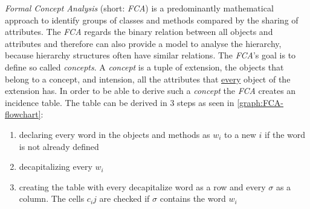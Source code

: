 \emph{Formal Concept Analysis} (short: \emph{FCA}) is a predominantly mathematical approach to identify groups of classes and methods compared by the sharing of attributes. The \emph{FCA} regards the binary relation between all objects and attributes and therefore can also provide a model to analyse the hierarchy, because hierarchy structures often have similar relations. \newline
The \emph{FCA}'s goal is to define so called \emph{concepts}. A \emph{concept} is a tuple of extension, the objects that belong to a concept, and intension, all the attributes that \underline{every} object of the extension has.
In order to be able to derive such a \emph{concept} the \emph{FCA} creates an incidence table. The table can be derived in 3 steps as seen in \autoref{graph:FCA-flowchart}:
\begin{enumerate}
  \item declaring every word in the objects and methods as $w_i$ to a new $i$ if the word is not already defined
  \item decapitalizing every $w_i$
  \item creating the table with every decapitalize word as a row and every $\sigma$ as a column. The cells $c_ij$ are checked if  $\sigma$ contains the word $w_i$
\end{enumerate}
\pagebreak
